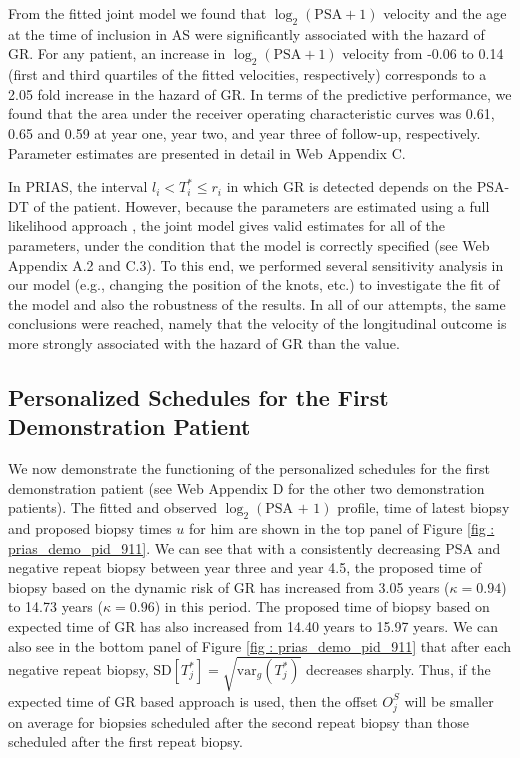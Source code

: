 From the fitted joint model we found that $\log_2 (\mbox{PSA} + 1)$ velocity and the age at the time of inclusion in AS were significantly associated with the hazard of GR. For any patient, an increase in $\log_2 (\mbox{PSA} + 1)$ velocity from -0.06 to 0.14 (first and third quartiles of the fitted velocities, respectively) corresponds to a 2.05 fold increase in the hazard of GR. In terms of the predictive performance, we found that the area under the receiver operating characteristic curves \citep{landmarking2017} was 0.61, 0.65 and 0.59 at year one, year two, and year three of follow-up, respectively. Parameter estimates are presented in detail in Web Appendix C.

In PRIAS, the interval $l_i < T_i^* \leq r_i$ in which GR is detected depends on the PSA-DT of the patient. However, because the parameters are estimated using a full likelihood approach \citep{tsiatis2004joint}, the joint model gives valid estimates for all of the parameters, under the condition that the model is correctly specified (see Web Appendix A.2 and C.3). To this end, we performed several sensitivity analysis in our model (e.g., changing the position of the knots, etc.) to investigate the fit of the model and also the robustness of the results. In all of our attempts, the same conclusions were reached, namely that the velocity of the longitudinal outcome is more strongly associated with the hazard of GR than the value.

\subsection{Personalized Schedules for the First Demonstration Patient}
\label{subsec : demo_prias_pers_schedule}
We now demonstrate the functioning of the personalized schedules for the first demonstration patient (see Web Appendix D for the other two demonstration patients). The fitted and observed $\log_2 (\mbox{PSA + 1})$ profile, time of latest biopsy and proposed biopsy times $u$ for him are shown in the top panel of Figure \ref{fig : prias_demo_pid_911}. We can see that with a consistently decreasing PSA and negative repeat biopsy between year three and year 4.5, the proposed time of biopsy based on the dynamic risk of GR has increased from 3.05 years ($\kappa=0.94$) to 14.73 years ($\kappa=0.96$) in this period. The proposed time of biopsy based on expected time of GR has also increased from 14.40 years to 15.97 years. We can also see in the bottom panel of Figure \ref{fig : prias_demo_pid_911} that after each negative repeat biopsy, $\mbox{SD}[T^*_j] = \sqrt{\mbox{var}_g(T^*_j)}$ decreases sharply. Thus, if the expected time of GR based approach is used, then the offset $O^S_j$ will be smaller on average for biopsies scheduled after the second repeat biopsy than those scheduled after the first repeat biopsy.


